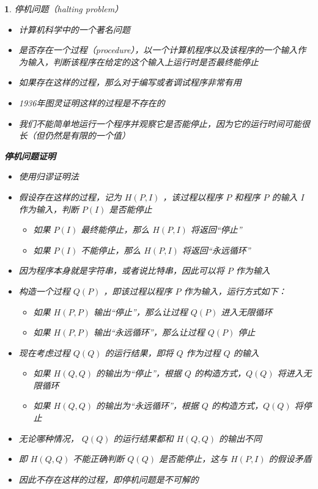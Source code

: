 \documentclass[UTF8]{report}
\theoremstyle{MyLineTheoremStyle} %
\theoremstyle{MyBlockTheoremStyle} %
\theoremstyle{MySubsubsectionStyle} %
\newtheorem{definition}{}
\begin{document}
\begin{definition}
    停机问题（halting problem）
    \begin{itemize}
        \item 计算机科学中的一个著名问题
        \item 是否存在一个过程（procedure），以一个计算机程序以及该程序的一个输入作为输入，判断该程序在给定的这个输入上运行时是否最终能停止
        \item 如果存在这样的过程，那么对于编写或者调试程序非常有用
        \item 1936年图灵证明这样的过程是不存在的
        \item 我们不能简单地运行一个程序并观察它是否能停止，因为它的运行时间可能很长（但仍然是有限的一个值）
    \end{itemize}

    \textbf{停机问题证明}
    \begin{itemize}
        \item 使用归谬证明法
        \item 假设存在这样的过程，记为 $H(P, I)$ ，该过程以程序 $P$ 和程序 $P$ 的输入 $I$ 作为输入，判断 $P(I)$ 是否能停止
        \begin{itemize}
            \item 如果 $P(I)$ 最终能停止，那么 $H(P, I)$ 将返回“停止”
            \item 如果 $P(I)$ 不能停止，那么 $H(P, I)$ 将返回“永远循环”
        \end{itemize}
        \item 因为程序本身就是字符串，或者说比特串，因此可以将 $P$ 作为输入
        \item 构造一个过程 $Q(P)$ ，即该过程以程序 $P$ 作为输入，运行方式如下：
        \begin{itemize}
            \item 如果 $H(P, P)$ 输出“停止”，那么让过程 $Q(P)$ 进入无限循环
            \item 如果 $H(P, P)$ 输出“永远循环”，那么让过程 $Q(P)$ 停止
        \end{itemize}
        \item 现在考虑过程 $Q(Q)$ 的运行结果，即将 $Q$ 作为过程 $Q$ 的输入
        \begin{itemize}
            \item 如果 $H(Q, Q)$ 的输出为“停止”，根据 $Q$ 的构造方式，$Q(Q)$ 将进入无限循环
            \item 如果 $H(Q, Q)$ 的输出为“永远循环”，根据 $Q$ 的构造方式，$Q(Q)$ 将停止
        \end{itemize}
        \item 无论哪种情况， $Q(Q)$ 的运行结果都和 $H(Q, Q)$ 的输出不同
        \item 即 $H(Q, Q)$ 不能正确判断 $Q(Q)$ 是否能停止，这与 $H(P, I)$ 的假设矛盾
        \item 因此不存在这样的过程，即停机问题是不可解的
    \end{itemize}
\end{definition}
\end{document}
